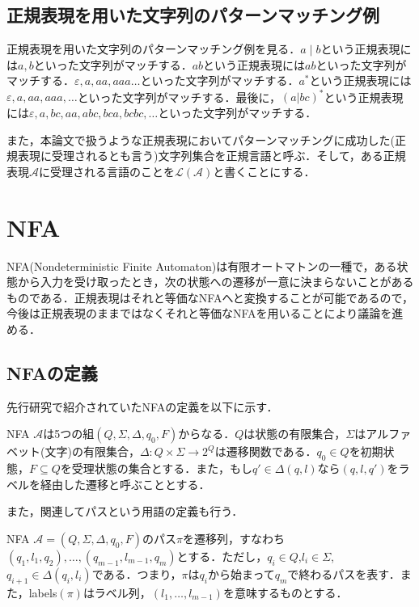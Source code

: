 \documentclass[a4paper, 12pt, dvipdfmx, uplatex]{jsreport}
\begin{document}
\subsection{正規表現を用いた文字列のパターンマッチング例}
正規表現を用いた文字列のパターンマッチング例を見る．$a\mid b$という正規表現には$a,b$といった文字列がマッチする．$ab$という正規表現には$ab$といった文字列がマッチする．$\varepsilon,a,aa,aaa\ldots$といった文字列がマッチする．$a^*$という正規表現には$\varepsilon,a,aa,aaa,\ldots$といった文字列がマッチする．最後に，$(a|bc)^*$という正規表現には$\varepsilon,a,bc,aa,abc,bca,bcbc,\ldots$といった文字列がマッチする．

また，本論文で扱うような正規表現においてパターンマッチングに成功した(正規表現に受理されるとも言う)文字列集合を正規言語と呼ぶ．そして，ある正規表現$\mathcal{A}$に受理される言語のことを$\mathcal{L(A)}$と書くことにする．


\section{NFA}
NFA(Nondeterministic Finite Automaton)は有限オートマトンの一種で，ある状態から入力を受け取ったとき，次の状態への遷移が一意に決まらないことがあるものである．正規表現はそれと等価なNFAへと変換することが可能であるので，今後は正規表現のままではなくそれと等価なNFAを用いることにより議論を進める．

\subsection{NFAの定義}
先行研究で紹介されていたNFAの定義を以下に示す．
\begin{dfn}
  NFA $\mathcal{A}$は5つの組$(Q,\Sigma,\Delta,q_0,F)$からなる．$Q$は状態の有限集合，$\Sigma$はアルファベット(文字)の有限集合，$\Delta :Q\times \Sigma \rightarrow 2^Q$は遷移関数である．$q_0 \in Q$を初期状態，$F \subseteq Q$を受理状態の集合とする．また，もし$q'\in \Delta (q,l)$なら$(q,l,q')$をラベルを経由した遷移と呼ぶこととする．
\end{dfn}

また，関連してパスという用語の定義も行う．

\begin{dfn}
  NFA $\mathcal{A}=(Q,\Sigma,\Delta,q_0,F)$のパス$\pi$を遷移列，すなわち$(q_1,l_1,q_2),\ldots,(q_{m-1},l_{m-1},q_{m})$とする．ただし，$q_i \in Q$,$l_i \in \Sigma$,$q_{i+1} \in \Delta(q_i,l_i)$である．つまり，$\pi$は$q_i$から始まって$q_m$で終わるパスを表す．また，labels$(\pi)$はラベル列，$(l_1,\ldots ,l_{m-1})$を意味するものとする．
\end{dfn}
\end{document}
